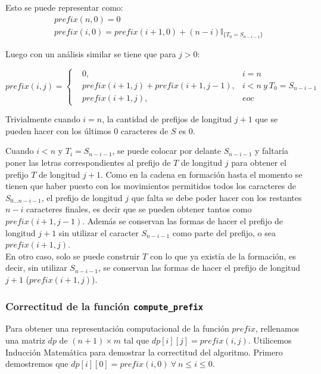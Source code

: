 \documentclass[a4paper]{article}
\begin{document}
    Esto se puede representar como:
    $$
    \begin{aligned}
        &prefix(n,0) = 0\\
        &prefix(i,0) = prefix(i+1,0) + (n-i)\mathbb{I}_{\{ T_0 = S_{n-i-1}\}}
    \end{aligned}
    $$

    Luego con un an\'alisis similar se tiene que para $j > 0$:

    $$prefix(i,j) = \left\{ \begin{aligned}
        &0,& i = n \\
        & prefix(i+1,j) + prefix(i+1,j-1),& i < n~ y~ T_0=S_{n-i-1} \\
        &prefix(i+1,j), & eoc
    \end{aligned}\right.$$ 

    Trivialmente cuando $i=n$, la cantidad de prefijos de longitud $j+1$
    que se pueden hacer con los \'ultimos $0$ caracteres de $S$ es $0$.

    Cuando $i < n$ y $T_i = S_{n-i-1}$, se puede colocar por delante $S_{n-i-1}$ y faltar\'ia poner las letras correspondientes
    al prefijo de $T$ de longitud $j$ para obtener el prefijo $T$ de longitud $j+1$. Como en la cadena en formaci\'on hasta el momento se tienen que 
    haber puesto con los movimientos permitidos todos los caracteres de $S_{0... n-i-1}$, el prefijo de longitud $j$ que falta se debe poder hacer con los 
    restantes $n-i$ caracteres finales, es decir que se pueden obtener tantos como $prefix(i+1, j-1)$. Adem\'as se conservan las formas de hacer el prefijo de longitud $j+1$
    sin utilizar el caracter $S_{n-i-1}$ como parte del prefijo, o sea $prefix(i+1,j)$.\\

    En otro caso, solo se puede construir $T$ con lo que ya exist\'ia de la formaci\'on, es decir,
    sin utilizar $S_{n-i-1}$, se conservan las formas de hacer el prefijo de longitud $j+1$ ($prefix(i+1,j)$).

    \subsubsection*{Correctitud de la funci\'on \texttt{compute\_prefix}}

    Para obtener una representaci\'on computacional de la funci\'on $prefix$,
rellenamos una matriz $dp$ de $(n+1) \times m$ tal que $dp[i][j] = prefix(i,j)$. Utilicemos Inducci\'on Matem\'atica 
para demostrar la correctitud del algoritmo. Primero demostremos que $dp[i][0] = prefix(i,0)~\forall~n\leq i \leq 0$. \\
\end{document}
